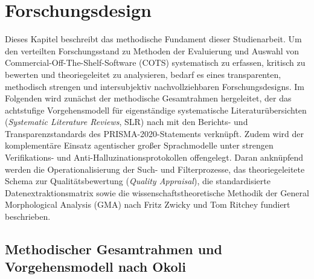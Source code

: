 
\section{Forschungsdesign}
\label{sec:forschungsdesign}

Dieses Kapitel beschreibt das methodische Fundament dieser Studienarbeit. Um den verteilten Forschungsstand zu Methoden der Evaluierung und Auswahl von Commercial-Off-The-Shelf-Software (COTS) systematisch zu erfassen, kritisch zu bewerten und theoriegeleitet zu analysieren, bedarf es eines transparenten, methodisch strengen und intersubjektiv nachvollziehbaren Forschungsdesigns. Im Folgenden wird zunächst der methodische Gesamtrahmen hergeleitet, der das achtstufige Vorgehensmodell für eigenständige systematische Literaturübersichten (\textit{Systematic Literature Reviews}, SLR) nach \textcite[S.~879 bis 910]{2NHFUF5N} mit den Berichts- und Transparenzstandards des PRISMA-2020-Statements \parencite[S.~1 bis 9]{BP42WGEK} verknüpft. Zudem wird der komplementäre Einsatz agentischer großer Sprachmodelle unter strengen Verifikations- und Anti-Halluzinationsprotokollen offengelegt. Daran anknüpfend werden die Operationalisierung der Such- und Filterprozesse, das theoriegeleitete Schema zur Qualitätsbewertung (\textit{Quality Appraisal}), die standardisierte Datenextraktionsmatrix sowie die wissenschaftstheoretische Methodik der General Morphological Analysis (GMA) nach Fritz Zwicky und Tom Ritchey \parencite[S.~81 bis 91]{Z6N6V5L9} fundiert beschrieben.

\subsection{Methodischer Gesamtrahmen und Vorgehensmodell nach Okoli}
\label{subsec:methodischer_gesamtrahmen}

